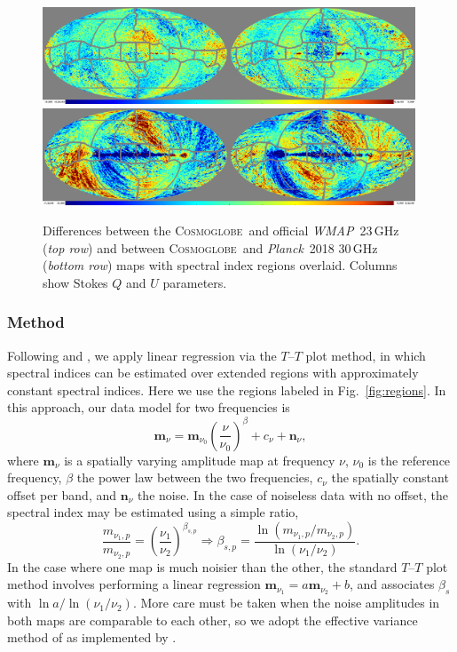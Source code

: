\documentclass[twocolumn]{../../common/aa}
\def\WMAP{\emph{WMAP}}
\def\Planck{\emph{Planck}}
\newcommand{\cosmoglobe}{\textsc{Cosmoglobe}}
\begin{document}
\begin{figure}
	\centering
	\includegraphics[width=0.99\textwidth]{figures/CG_023-WMAP_K_diff_wmap9_v1_t15_maskreg_all.png}\\
	\includegraphics[width=0.99\textwidth]{figures/CG_030_diff_dx12_v1_t15_maskreg_all.png}\\
	\caption{Differences between the \cosmoglobe\ and official \WMAP\ 23\,GHz (\emph{top row}) and between \cosmoglobe\ and \Planck\ 2018 30\,GHz (\emph{bottom row}) maps with spectral index regions overlaid. Columns show Stokes $Q$ and $U$ parameters.
		}
       \label{fig:diff_regions}
\end{figure}


\subsubsection{Method}
\label{sec:tt_plot_method}

Following \citet{fuskeland2014} and \citet{fuskeland:2019}, we apply linear regression via the $T$--$T$ plot method, in which spectral indices can be estimated over extended regions with approximately constant spectral indices. Here we use the regions labeled in Fig.~\ref{fig:regions}. In this approach, our data model for two frequencies is
\begin{equation}
	\boldsymbol m_\nu = \boldsymbol m_{\nu_0}\left(\frac\nu{\nu_0}\right)^\beta+c_\nu+\boldsymbol n_\nu ,
\end{equation}
where $\boldsymbol m_\nu$ is a spatially varying amplitude map at frequency $\nu$, $\nu_0$ is the reference frequency, $\beta$ the power law between the two frequencies, $c_\nu$ the spatially constant offset per band, and $\boldsymbol n_\nu$ the noise.  In the case of noiseless data with no offset, the spectral index may be estimated using a simple ratio,
\begin{equation}
	\frac{m_{\nu_1,p}}{m_{\nu_2,p}}
	=\left(\frac{\nu_1}{\nu_2}\right)^{\beta_{s,p}}
	\Rightarrow
	\beta_{s,p}=\frac{\ln(m_{\nu_1,p}/m_{\nu_2,p})}{\ln(\nu_1/\nu_2)}.
\end{equation}
In the case where one map is much noisier than the other, the standard $T$--$T$ plot method involves performing  a linear regression $\boldsymbol m_{\nu_1}=a\boldsymbol m_{\nu_2}+b$, and associates $\beta_s$ with $\ln a/\ln(\nu_1/\nu_2)$. More care must be taken when the noise amplitudes in both maps are comparable to each other, so we adopt the effective variance method of \citet{orear1982} as implemented by \citet{fuskeland2014}.
\end{document}
